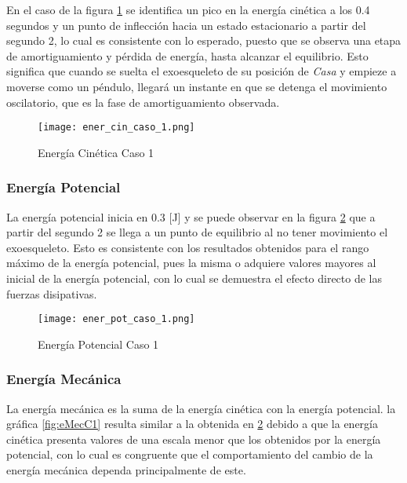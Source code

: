     En el caso de la figura \ref{fig:eCinC1} se identifica un pico en la energía 
    cinética a los 0.4 segundos y un punto de inflección hacia un estado estacionario 
    a partir del segundo 2, lo cual 
    es consistente con lo esperado, puesto que se observa una etapa de 
    amortiguamiento y pérdida de energía, hasta alcanzar el equilibrio. Esto significa 
    que cuando se suelta el exoesqueleto de su posición de \emph{Casa} y 
    empieze a moverse como un péndulo, llegará un instante en que se detenga el 
    movimiento oscilatorio, que es la fase de amortiguamiento observada.

    \begin{figure}[H]%
            \centering
            \texttt{[image: ener\_cin\_caso\_1.png]} 
        \caption{Energía Cinética Caso 1}
        \label{fig:eCinC1}
    \end{figure}

    \subsubsection{Energía Potencial}
    La energía potencial inicia en 0.3 [J] y se puede observar en la figura 
    \ref{fig:ePotC1} que a partir del segundo 2 se llega a un punto de equilibrio al no tener 
    movimiento el exoesqueleto. Esto es consistente con los resultados obtenidos para 
    el rango máximo de la energía potencial, pues la misma o adquiere valores mayores al 
    inicial de la energía potencial, con lo cual se demuestra el efecto directo de las 
    fuerzas disipativas.

    \begin{figure} [H]%
            \centering
            \texttt{[image: ener\_pot\_caso\_1.png]} 
        \caption{Energía Potencial Caso 1}
        \label{fig:ePotC1}
    \end{figure}

    \subsubsection{Energía Mecánica}
    La energía mecánica es la suma de la energía cinética con la energía potencial. 
    la gráfica \ref{fig:eMecC1} resulta similar a la obtenida en \ref{fig:ePotC1} 
    debido a que la energía cinética presenta valores de una escala menor que los 
    obtenidos por la energía potencial, con lo cual es congruente que el comportamiento 
    del cambio de la energía mecánica dependa principalmente de este.

